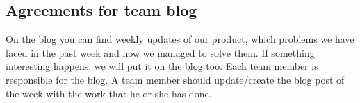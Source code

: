 \subsection{Agreements for team blog}
On the blog you can find weekly updates of our product, which problems we have faced in the past week and how we managed to solve them. If something interesting happens, we will put it on the blog too. Each team member is responsible for the blog. A team member should update/create the blog post of the week with the work that he or she has done. 

